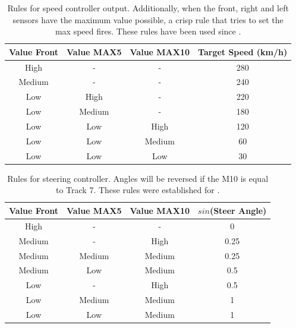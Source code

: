 \documentclass[10pt,journal,compsoc]{IEEEtran}
\begin{document}
%
\begin{table}[h!tb]
  \centering
  {\scriptsize
    \caption{Rules for speed controller output. Additionally, when
      the front, right and left sensors have the maximum value
      possible, a crisp rule that tries to set the max speed
      fires. These rules have been used since \cite{salem_evo18}. \label{tab:output:speed}}
    \begin{tabular}{|c|c|c||c|}
\hline
      Value Front & Value MAX5 & Value MAX10 & Target Speed (km/h) \\
      \hline
    	 High & - & - & 280 \\
      Medium & - & - & 240 \\
      Low & High & - & 220 \\
      Low & Medium & - & 180 \\
      Low & Low & High & 120 \\
      Low & Low & Medium & 60 \\           
      Low & Low & Low & 30 \\     
\hline
\end{tabular}
}
\end{table}
%
%
\begin{table}[h!tb]
  \centering
  {\scriptsize
    \caption{Rules for steering controller. Angles will be reversed
      if the M10 is equal to Track 7. These rules were established for \cite{salem_evo18}. \label{tab:output:steer}}
    \begin{tabular}{|c|c|c||c|}
\hline
      Value Front & Value MAX5 & Value MAX10 & $sin$(Steer Angle) \\
\hline
      High & - & - & 0 \\
      Medium & - & High & 0.25 \\
      Medium & Medium & Medium & 0.25 \\
      Medium & Low & Medium & 0.5 \\
      Low & - & High & 0.5 \\
      Low & Medium & Medium & 1 \\
      Low & Low & Medium & 1 \\ 
      
\hline
\end{tabular}
}
\end{table}
\end{document}

